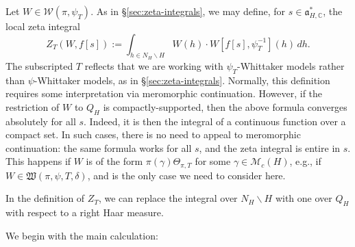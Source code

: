 \documentclass[reqno]{amsart}
\theoremstyle{plain} \newtheorem{theorem} {Theorem}
\theoremstyle{definition} \newtheorem{definition} [theorem] {Definition}
\theoremstyle{itplain} %
\numberwithin{equation}{section}
\numberwithin{theorem}{section}
\begin{document}
Let $W \in \mathcal{W}(\pi,\psi_T)$.  As in \S\ref{sec:zeta-integrals}, we may define, for $s \in \mathfrak{a}_{H,\mathbb{C}}^*$, the local zeta integral
\begin{equation*}
  Z_T(W,f[s])
  :=
  \int _{h \in N_H \backslash H}
  W(h) \cdot W[f[s], \psi_T^{-1}](h) \, d h.
\end{equation*}
The subscripted $T$ reflects that we are working with $\psi_T$-Whittaker models rather than $\psi$-Whittaker models, as in \S\ref{sec:zeta-integrals}.  Normally, this definition requires some interpretation via meromorphic continuation.  However, if the restriction of $W$ to $Q_H$ is compactly-supported, then the above formula converges absolutely for all $s$.  Indeed, it is then the integral of a continuous function over a compact set.  In such cases, there is no need to appeal to meromorphic continuation: the same formula works for all $s$, and the zeta integral is entire in $s$.  This happens if $W$ is of the form $\pi(\gamma) \Theta_{\pi,T}$ for some $\gamma \in \mathcal{M}_c(H)$, e.g., if $W \in \mathfrak{W}(\pi,\psi,T,\delta)$, and is the only case we need to consider here.

In the definition of $Z_T$, we can replace the integral over $N_H \backslash H$ with one over $Q_H$ with respect to a right Haar measure.


We begin with the main calculation:
\end{document}
